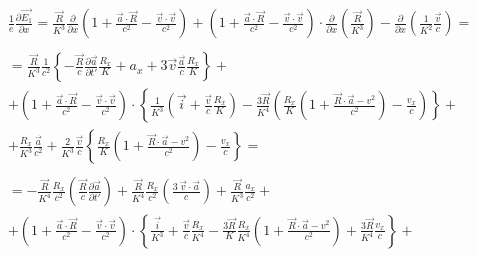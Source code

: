 \documentclass[11pt]{article}
\begin{document}
\begin{align}
  & \frac{1}{e}\frac{\partial \overrightarrow{{{E}_{1}}}}{\partial x}=\frac{\overrightarrow{R}}{{{K}^{3}}}\frac{\partial }{\partial x}\left( 1+\frac{\overrightarrow{a}\cdot \overrightarrow{R}}{{{c}^{2}}}-\frac{\overrightarrow{v}\cdot \overrightarrow{v}}{{{c}^{2}}} \right)+\left( 1+\frac{\overrightarrow{a}\cdot \overrightarrow{R}}{{{c}^{2}}}-\frac{\overrightarrow{v}\cdot \overrightarrow{v}}{{{c}^{2}}} \right)\cdot \frac{\partial }{\partial x}\left( \frac{\overrightarrow{R}}{{{K}^{3}}} \right)-\frac{\partial }{\partial x}\left( \frac{1}{{{K}^{2}}}\frac{\overrightarrow{v}}{c} \right)= \\ 
 &  \\ 
 & =\frac{\overrightarrow{R}}{{{K}^{3}}}\frac{1}{{{c}^{2}}}\left\{ -\frac{\overrightarrow{R}}{c}\frac{\partial \overrightarrow{a}}{\partial t'}\frac{{{R}_{x}}}{K}+{{a}_{x}}+3\overrightarrow{v}\frac{\overrightarrow{a}}{c}\frac{{{R}_{x}}}{K} \right\}+ \\ 
 & +\left( 1+\frac{\overrightarrow{a}\cdot \overrightarrow{R}}{{{c}^{2}}}-\frac{\overrightarrow{v}\cdot \overrightarrow{v}}{{{c}^{2}}} \right)\cdot \left\{ \frac{1}{{{K}^{3}}}\left( \overrightarrow{i}+\frac{\overrightarrow{v}}{c}\frac{{{R}_{x}}}{K} \right)-\frac{3\overrightarrow{R}}{{{K}^{4}}}\left( \frac{{{R}_{x}}}{K}\left( 1+\frac{\overrightarrow{R}\cdot \overrightarrow{a}-{{v}^{2}}}{{{c}^{2}}} \right)-\frac{{{v}_{x}}}{c} \right) \right\}+ \\ 
 & +\frac{{{R}_{x}}}{{{K}^{3}}}\frac{\overrightarrow{a}}{{{c}^{2}}}+\frac{2}{{{K}^{3}}}\frac{\overrightarrow{v}}{c}\left\{ \frac{{{R}_{x}}}{K}\left( 1+\frac{\overrightarrow{R}\cdot \overrightarrow{a}-{{v}^{2}}}{{{c}^{2}}} \right)-\frac{{{v}_{x}}}{c} \right\}= \\ 
 &  \\ 
 & =-\frac{\overrightarrow{R}}{{{K}^{4}}}\frac{{{R}_{x}}}{{{c}^{2}}}\left( \frac{\overrightarrow{R}}{c}\frac{\partial \overrightarrow{a}}{\partial t'} \right)+\frac{\overrightarrow{R}}{{{K}^{4}}}\frac{{{R}_{x}}}{{{c}^{2}}}\left( \frac{3\ \overrightarrow{v}\cdot \overrightarrow{a}}{c} \right)+\frac{\overrightarrow{R}}{{{K}^{3}}}\frac{{{a}_{x}}}{{{c}^{2}}}+ \\ 
 & +\left( 1+\frac{\overrightarrow{a}\cdot \overrightarrow{R}}{{{c}^{2}}}-\frac{\overrightarrow{v}\cdot \overrightarrow{v}}{{{c}^{2}}} \right)\cdot \left\{ \frac{\overrightarrow{i}}{{{K}^{3}}}+\frac{\overrightarrow{v}}{c}\frac{{{R}_{x}}}{{{K}^{4}}}-\frac{3\overrightarrow{R}}{K}\frac{{{R}_{x}}}{{{K}^{4}}}\left( 1+\frac{\overrightarrow{R}\cdot \overrightarrow{a}-{{v}^{2}}}{{{c}^{2}}} \right)+\frac{3\overrightarrow{R}}{{{K}^{4}}}\frac{{{v}_{x}}}{c} \right\}+ \\ 

\end{align}
\end{document}
